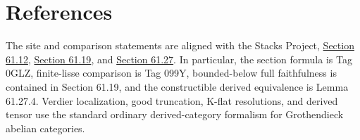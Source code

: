 \documentclass[10pt]{article}
\theoremstyle{definition}
\begin{document}
\section{References}

The site and comparison statements are aligned with the Stacks Project,
\href{https://stacks.math.columbia.edu/tag/0988}{Section 61.12},
\href{https://stacks.math.columbia.edu/tag/099R}{Section 61.19}, and
\href{https://stacks.math.columbia.edu/tag/09AI}{Section 61.27}.  In particular,
the section formula is Tag 0GLZ, finite-lisse comparison is Tag 099Y,
bounded-below full faithfulness is contained in Section 61.19, and the
constructible derived equivalence is Lemma 61.27.4.  Verdier localization,
good truncation, K-flat resolutions, and derived tensor use the standard
ordinary derived-category formalism for Grothendieck abelian categories.
\end{document}
